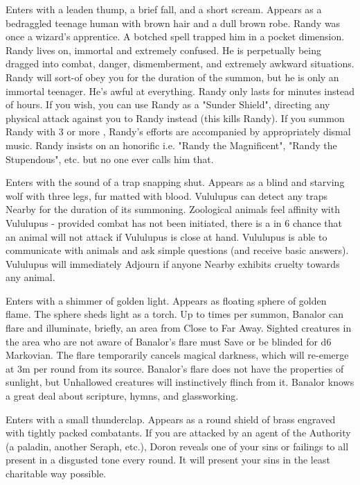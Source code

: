 {
Enters with a leaden thump, a brief fall, and a short scream. Appears as a bedraggled teenage human with brown hair and a dull brown robe. Randy was once a wizard's apprentice. A botched spell trapped him in a pocket dimension. Randy lives on, immortal and extremely confused. He is perpetually being dragged into combat, danger, dismemberment, and extremely awkward situations. Randy will sort-of obey you for the duration of the summon, but he is only an immortal teenager. He's awful at everything. Randy only lasts for \SUMDICE minutes instead of \SUMDICE hours.  If you wish, you can use Randy as a "Sunder Shield", directing any physical attack against you to Randy instead (this kills Randy).  If you summon Randy with 3 or more \DICE, Randy's efforts are accompanied by appropriately dismal music.  Randy insists on an honorific i.e. "Randy the Magnificent", "Randy the Stupendous", etc. but no one ever calls him that.


Enters with the sound of a trap snapping shut. Appears as a blind and starving wolf with three legs, fur matted with blood.  Vululupus can detect any traps Nearby for the duration of its summoning.  Zoological animals feel affinity with Vululupus - provided combat has not been initiated, there is a \DICE in 6 chance that an animal will not attack if Vululupus is close at hand.  Vululupus is able to communicate with animals and ask simple questions (and receive basic answers).  Vululupus will immediately Adjourn if anyone Nearby exhibits cruelty towards any animal.

Enters with a shimmer of golden light. Appears as floating sphere of golden flame. The sphere sheds light as a torch. Up to \DICE times per summon, Banalor can flare and illuminate, briefly, an area from Close to Far Away. Sighted creatures in the area who are not aware of Banalor's flare must Save or be blinded for d6 Markovian. The flare temporarily cancels magical darkness, which will re-emerge at 3m per round from its source. Banalor's flare does not have the properties of sunlight, but Unhallowed creatures will instinctively flinch from it. Banalor knows a great deal about scripture, hymns, and glassworking.


Enters with a small thunderclap. Appears as a round shield of brass engraved with tightly packed combatants. If you are attacked by an agent of the Authority (a paladin, another Seraph, etc.), Doron reveals one of your sins or failings to all present in a disgusted tone every round.  It will present your sins in the least charitable way possible.



}
